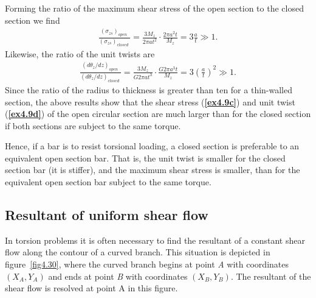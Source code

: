 \documentclass{AeroStructure-ERJohnson}
\begin{document}
\begin{example}
Forming the ratio of the maximum shear stress of the open section to the closed section we find
\begin{align}\label{ex4.9c}
\frac{(\sigma_{z s})_{\textit{open }}}{(\sigma_{z s})_{\textit{closed }}}=\frac{3 M_{z}}{2 \pi a t^{2}} \cdot \frac{2 \pi a^{2} t}{M_{z}}=3 \frac{a}{t} \gg 1.
\end{align}
Likewise, the ratio of the unit twists are
\begin{align}\label{ex4.9d}
\frac{(d \theta_{z}/d z)_{\textit{open }}}{(d \theta_{z}/d z)_{\textit{closed }}}=\frac{3 M_{z}}{G 2 \pi a t^{3}} \cdot \frac{G 2 \pi a^{3} t}{M_{z}}=3\left(\frac{a}{t}\right)^{2} \gg 1.
\end{align}
Since the ratio of the radius to thickness is greater than ten for a thin-walled section, the above results show that the shear stress (\textbf{\ref{ex4.9c}}) and unit twist (\textbf{\ref{ex4.9d}}) of the open circular section are much larger than for the closed section if both sections are subject to the same torque.

Hence, if a bar is to resist torsional loading, a closed section is preferable to an equivalent open section bar. That is, the unit twist is smaller for the closed section bar (it is stiffer), and the maximum shear stress is smaller, than for the equivalent open section bar subject to the same torque.
\end{example}



\subsection{Resultant of uniform shear flow}\label{sec4.4.1}\setcounter{equation}{51}

\noindent
In torsion problems it is often necessary to find the resultant of a constant shear flow along the contour of a curved branch. This situation is depicted in figure~\ref{fig4.30}, where the curved branch begins at point \textit{A} with coordinates $\left(X_{A}, Y_{A}\right)$ and ends at point \textit{B} with coordinates $\left(X_{B}, Y_{B}\right)$. The resultant of the shear flow is resolved at point A in this figure.
\end{document}
